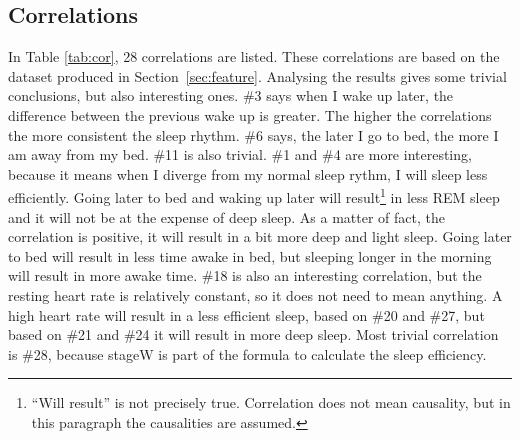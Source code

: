	\subsection{Correlations}
	\label{sec:correlations}
	In Table \ref{tab:cor}, 28 correlations are listed. These correlations are based on the dataset produced in Section~\ref{sec:feature}. Analysing the results gives some trivial conclusions, but also interesting ones. \#3 says when I wake up later, the difference between the previous wake up is greater. The higher the correlations the more consistent the sleep rhythm. \#6 says, the later I go to bed, the more I am away from my bed. \#11 is also trivial. \#1 and \#4 are more interesting, because it means when I diverge from my normal sleep rythm, I will sleep less efficiently. Going later to bed and waking up later will result\footnote{``Will result'' is not precisely true. Correlation does not mean causality, but in this paragraph the causalities are assumed.}  in less REM sleep and it will not be at the expense of deep sleep. As a matter of fact, the correlation is positive, it will result in a bit more deep and light sleep. Going later to bed will result in less time awake in bed, but sleeping longer in the morning will result in more awake time. \#18 is also an interesting correlation, but the resting heart rate is relatively constant, so it does not need to mean anything. A high heart rate will result in a less efficient sleep, based on \#20 and \#27, but based on \#21 and \#24 it will result in more deep sleep. Most trivial correlation is \#28, because stageW is part of the formula to calculate the sleep efficiency.
		

